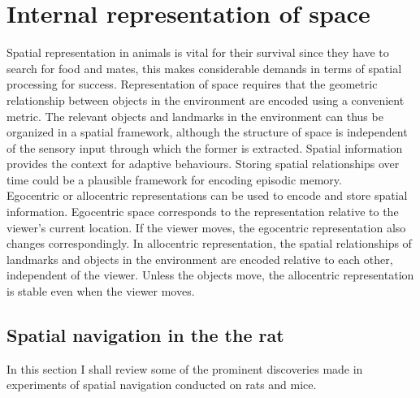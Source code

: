 \section{Internal representation of space} 

\label{space} 


Spatial representation in animals is vital for their survival since they have to search for food and mates, this makes considerable demands in terms of spatial processing for success. Representation of space requires that the geometric relationship between objects in the environment are encoded using a convenient metric. The relevant objects and landmarks in the environment can thus be organized in a spatial framework, although the structure of space is independent of the sensory input through which the former is extracted. Spatial information provides the context for adaptive behaviours. Storing spatial relationships over time could be a plausible framework for encoding episodic memory. \\
Egocentric or allocentric representations can be used to encode and store spatial information. Egocentric space corresponds to the representation relative to the viewer's current location. If the viewer moves, the egocentric representation also changes correspondingly. In allocentric representation, the spatial relationships of landmarks and objects in the environment are encoded relative to each other, independent of the viewer. Unless the objects move, the allocentric representation is stable even when the viewer moves.

\subsection{Spatial navigation in the the rat}
In this section I shall review some of the prominent discoveries made in experiments of spatial navigation conducted on rats and mice.

